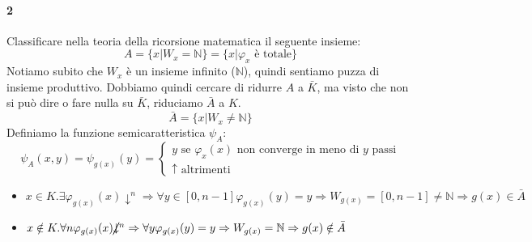 \documentclass[a4paper,oneside]{scrbook}
\begin{document}
\paragraph{2} Classificare nella teoria della ricorsione matematica il seguente insieme:
\begin{equation*}
    A=\{x|W_x=\mathbb{N}\}=\{x|\varphi_x \text{ è totale}\}
\end{equation*}
Notiamo subito che $W_x$ è un insieme infinito ($\mathbb{N}$), quindi sentiamo puzza di insieme produttivo. Dobbiamo quindi cercare di ridurre $A$ a $\bar{K}$, ma visto
che non si può dire o fare nulla su $\bar{K}$, riduciamo $\bar{A}$ a $K$.
$$\bar{A}=\{x|W_x\ne \mathbb{N}\}$$
Definiamo la funzione semicaratteristica $\psi_A$:
\begin{equation*}
    \psi_A(x,y)=
    \psi_{g(x)}(y)=
    \begin{cases}
        y \text{ se } \varphi_x(x) \text{ non converge in meno di $y$ passi}\\
        \uparrow \text{ altrimenti}
    \end{cases}
\end{equation*}
\begin{itemize}
    \item $x\in K.\exists \varphi_{g(x)}(x)\downarrow^n \Rightarrow \forall y \in [0,n-1] \varphi_{g(x)}(y)=y \Rightarrow W_{g(x)}=[0,n-1]\ne \mathbb{N} \Rightarrow g(x) \in \bar{A}$
    \item $x\notin K.\forall n \varphi_{g(x)}(x)\cancel{\downarrow}^n \Rightarrow \forall y \varphi_{g(x)}(y)=y \Rightarrow W_{g(x)}=\mathbb{N} \Rightarrow g(x) \notin \bar{A}$ 
\end{itemize}
\end{document}
